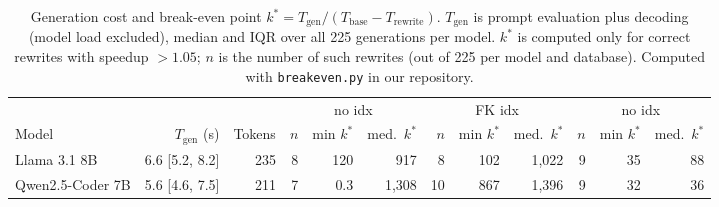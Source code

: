 \begin{table}[t]
\centering
\footnotesize
\begin{adjustbox}{max width=\columnwidth}
\begin{tabular}{l r r r r r r r r r r r}
\toprule
 & & & \multicolumn{3}{c}{no idx} & \multicolumn{3}{c}{FK idx} & \multicolumn{3}{c}{no idx} \\
\cmidrule(lr){4-6}\cmidrule(lr){7-9}\cmidrule(lr){10-12}
Model & $T_\text{gen}$ (s) & Tokens & $n$ & min $k^*$ & med.\ $k^*$ & $n$ & min $k^*$ & med.\ $k^*$ & $n$ & min $k^*$ & med.\ $k^*$ \\
\midrule
Llama 3.1 8B & 6.6 [5.2, 8.2] & 235 & 8 & 120 & 917 & 8 & 102 & 1{,}022 & 9 & 35 & 88 \\
Qwen2.5-Coder 7B & 5.6 [4.6, 7.5] & 211 & 7 & 0.3 & 1{,}308 & 10 & 867 & 1{,}396 & 9 & 32 & 36 \\
\bottomrule
\end{tabular}
\end{adjustbox}
\caption{Generation cost and break-even point $k^* = T_\text{gen}/(T_\text{base}-T_\text{rewrite})$. $T_\text{gen}$ is prompt evaluation plus decoding (model load excluded), median and IQR over all 225 generations per model. $k^*$ is computed only for correct rewrites with speedup $>1.05$; $n$ is the number of such rewrites (out of 225 per model and database). Computed with \texttt{breakeven.py} in our repository.}
\label{tab:gencost}
\end{table}
